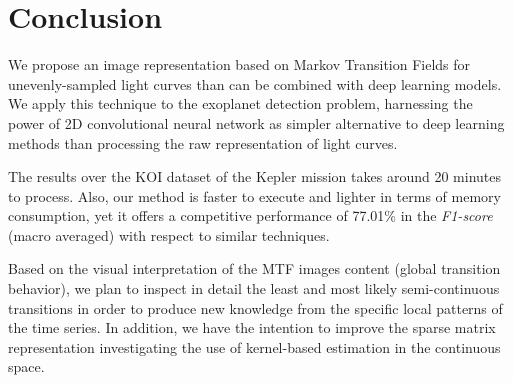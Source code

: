 \section{Conclusion}

We propose an image representation based on Markov Transition Fields for unevenly-sampled light curves than can be combined with deep learning models. 
We apply this technique to the exoplanet detection problem, harnessing the power of 2D convolutional neural network as simpler alternative to deep learning methods than processing the raw representation of light curves.

The results over the KOI dataset of the Kepler mission takes around 20 minutes to process. Also, our method is faster to execute and lighter in terms of memory consumption, yet it offers a competitive performance of 77.01\% in the \textit{F1-score} (macro averaged) with respect to similar techniques. 



Based on the visual interpretation of the MTF images content (global transition behavior), we plan to inspect in detail the least and most likely semi-continuous transitions in order to produce new knowledge from the specific local patterns of the time series. In addition, we have the intention to improve the sparse matrix representation investigating the use of kernel-based estimation in the continuous space.


